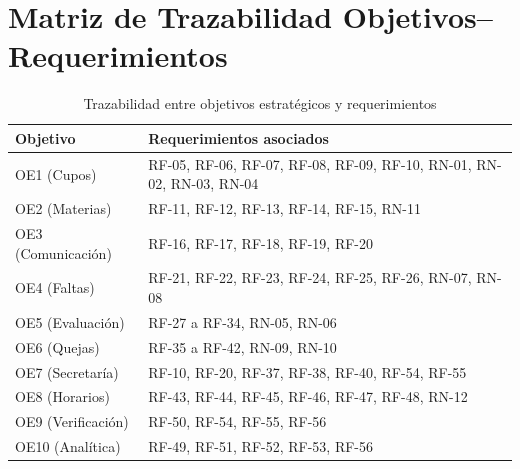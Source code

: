 \section{Matriz de Trazabilidad Objetivos--Requerimientos}

\begin{table}[H]
\centering
\caption{Trazabilidad entre objetivos estratégicos y requerimientos}
\label{tab:trazabilidad}
\small
\begin{tabularx}{\textwidth}{@{}l X@{}}
\toprule
\rowcolor{moradoClaro}
\textbf{Objetivo} & \textbf{Requerimientos asociados} \\
\midrule
OE1 (Cupos) & RF-05, RF-06, RF-07, RF-08, RF-09, RF-10, RN-01, RN-02, RN-03, RN-04 \\
OE2 (Materias) & RF-11, RF-12, RF-13, RF-14, RF-15, RN-11 \\
OE3 (Comunicación) & RF-16, RF-17, RF-18, RF-19, RF-20 \\
OE4 (Faltas) & RF-21, RF-22, RF-23, RF-24, RF-25, RF-26, RN-07, RN-08 \\
OE5 (Evaluación) & RF-27 a RF-34, RN-05, RN-06 \\
OE6 (Quejas) & RF-35 a RF-42, RN-09, RN-10 \\
OE7 (Secretaría) & RF-10, RF-20, RF-37, RF-38, RF-40, RF-54, RF-55 \\
OE8 (Horarios) & RF-43, RF-44, RF-45, RF-46, RF-47, RF-48, RN-12 \\
OE9 (Verificación) & RF-50, RF-54, RF-55, RF-56 \\
OE10 (Analítica) & RF-49, RF-51, RF-52, RF-53, RF-56 \\
\bottomrule
\end{tabularx}
\end{table}